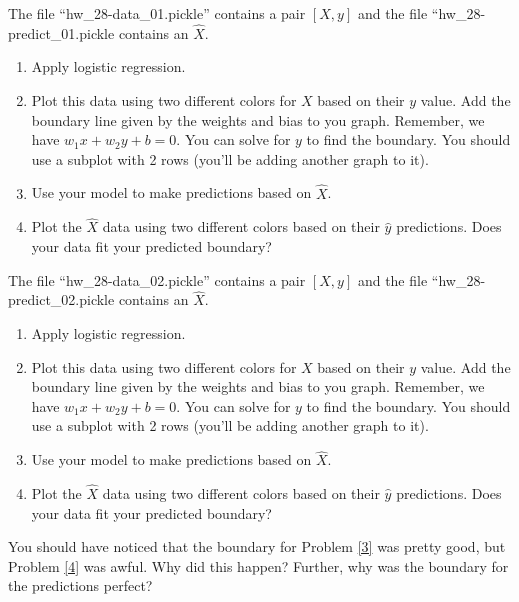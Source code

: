 \documentclass[11pt,letterpaper]{article}
\begin{document}
\begin{problem}
\label{3}
 The file ``hw\_28-data\_01.pickle'' contains a pair $[X,y]$ and the file ``hw\_28-predict\_01.pickle contains an $\hat{X}$.
 \begin{enumerate}
  \item Apply logistic regression.
  \item Plot this data using two different colors for $X$ based on their $y$ value. Add the boundary line given by the weights and bias to you graph. Remember, we have $w_1x+w_2y +b = 0$. You can solve for $y$ to find the boundary. You should use a subplot with 2 rows (you'll be adding another graph to it).
  \item Use your model to make predictions based on $\hat{X}$.
  \item Plot the $\hat{X}$ data using two different colors based on their $\hat{y}$ predictions. Does your data fit your predicted boundary?
 \end{enumerate}
\end{problem}




\begin{problem}
\label{4}
 The file ``hw\_28-data\_02.pickle'' contains a pair $[X,y]$ and the file ``hw\_28-predict\_02.pickle contains an $\hat{X}$.
 \begin{enumerate}
  \item Apply logistic regression.
  \item Plot this data using two different colors for $X$ based on their $y$ value. Add the boundary line given by the weights and bias to you graph. Remember, we have $w_1x+w_2y +b = 0$. You can solve for $y$ to find the boundary. You should use a subplot with 2 rows (you'll be adding another graph to it).
  \item Use your model to make predictions based on $\hat{X}$.
  \item Plot the $\hat{X}$ data using two different colors based on their $\hat{y}$ predictions. Does your data fit your predicted boundary?
 \end{enumerate}
\end{problem}



\begin{problem}
 You should have noticed that the boundary for Problem \ref{3} was pretty good, but Problem \ref{4} was awful. Why did this happen? Further, why was the boundary for the predictions perfect?
\end{problem}
\end{document}
